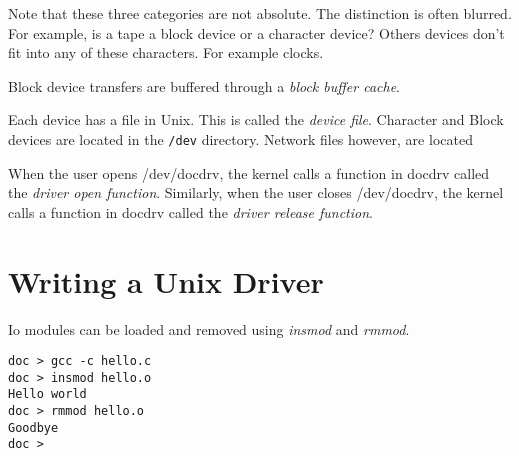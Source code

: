 Note that these three categories are not absolute. 
The distinction is often blurred. For example, is a tape a 
block device or a character device? Others devices don't fit 
into any of these characters.
For example clocks.


Block device transfers are buffered through a \textit{block buffer cache}.

Each device has a file in Unix. This is called the \textit{device file}.
Character and Block devices are located in the \lstinline{/dev} directory.
Network files however, are located 

When the user opens /dev/docdrv, the kernel calls a function in docdrv called the
\textit{driver open function}. Similarly, when the user closes /dev/docdrv, 
the kernel calls a function in docdrv called the \textit{driver release function}.



\section{Writing a Unix Driver}

Io modules can be loaded and removed using \textit{insmod} and \textit{rmmod}.

\begin{lstlisting}
doc > gcc -c hello.c
doc > insmod hello.o
Hello world
doc > rmmod hello.o
Goodbye
doc >
\end{lstlisting}